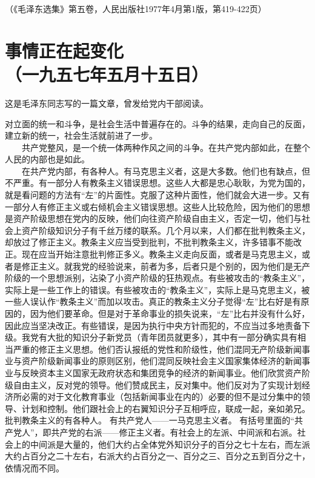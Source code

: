 \documentclass[cn,11pt,chinese]{elegantbook}
\def\myformat#1{\hfil\hfil #1}
\begin{document}
\begin{flushright}（《毛泽东选集》第五卷，人民出版社1977年4月第1版，第419-422页）\end{flushright}
\newpage\section*{\myformat{事情正在起变化}\\\myformat{（一九五七年五月十五日）}}
\begin{introduction}\item 这是毛泽东同志写的一篇文章，曾发给党内干部阅读。\end{introduction}
对立面的统一和斗争，是社会生活中普遍存在的。斗争的结果，走向自己的反面，建立新的统一，社会生活就前进了一步。\\
　　共产党整风，是一个统一体两种作风之间的斗争。在共产党内部如此，在整个人民的内部也是如此。\\
　　在共产党内部，有各种人。有马克思主义者，这是大多数。他们也有缺点，但不严重。有一部分人有教条主义错误思想。这些人大都是忠心耿耿，为党为国的，就是看问题的方法有“左”的片面性。克服了这种片面性，他们就会大进一步。又有一部分人有修正主义或右倾机会主义错误思想。这些人比较危险，因为他们的思想是资产阶级思想在党内的反映，他们向往资产阶级自由主义，否定一切，他们与社会上资产阶级知识分子有千丝万缕的联系。几个月以来，人们都在批判教条主义，却放过了修正主义。教条主义应当受到批判，不批判教条主义，许多错事不能改正。现在应当开始注意批判修正多义。教条主义走向反面，或者是马克思主义，或者是修正主义。就我党的经验说来，前者为多，后者只是个别的，因为他们是无产阶级的一个思想派别，沾染了小资产阶级的狂热观点。有些被攻击的“教条主义”，实际上是一些工作上的错误。有些被攻击的“教条主义”，实际上是马克思主义，被一些人误认作“教条主义”而加以攻击。真正的教条主义分子觉得“左”比右好是有原因的，因为他们要革命。但是对于革命事业的损失说来，“左”比右并没有什么好，因此应当坚决改正。有些错误，是因为执行中央方针而犯的，不应当过多地责备下级。我党有大批的知识分子新党员（青年团员就更多），其中有一部分确实具有相当严重的修正主义思想。他们否认报纸的党性和阶级性，他们混同无产阶级新闻事业与资产阶级新闻事业的原则区别，他们混同反映社会主义国家集体经济的新闻事业与反映资本主义国家无政府状态和集团竞争的经济的新闻事业。他们欣赏资产阶级自由主义，反对党的领导。他们赞成民主，反对集中。他们反对为了实现计划经济所必需的对于文化教育事业（包括新闻事业在内的）必要的但不是过分集中的领导、计划和控制。他们跟社会上的右翼知识分子互相呼应，联成一起，亲如弟兄。批判教条主义的有各种人。 有共产党人——一马克思主义者。 有括号里面的“共产党人”，即共产党的右派——修正主义者。有社会上的左派、中间派和右派。社会上的中间派是大量的，他们大约占全体党外知识分子的百分之七十左右，而左派大约占百分之二十左右，右派大约占百分之一、百分之三、百分之五到百分之十，依情况而不同。\\
\end{document}
